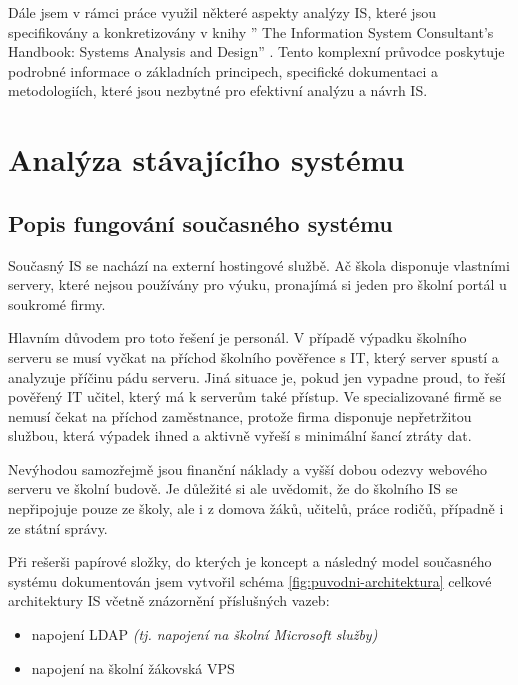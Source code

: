 \documentclass[FM,Proj]{tulthesis}
\begin{document}
Dále jsem v rámci práce využil některé aspekty analýzy
IS, které jsou specifikovány a
konkretizovány v knihy '' The Information System 
Consultant's Handbook: Systems Analysis and Design''
\cite{davis2019information}. Tento komplexní průvodce
poskytuje podrobné informace o základních principech,
specifické dokumentaci a metodologiích, 
které jsou nezbytné pro efektivní analýzu a návrh
IS.

\chapter{Analýza stávajícího systému}
\section{Popis fungování současného systému}
Současný IS se nachází na externí hostingové službě. Ač škola disponuje vlastními 
servery, které nejsou používány pro výuku, pronajímá si jeden pro školní portál u soukromé firmy.

Hlavním důvodem pro toto řešení je personál. V případě výpadku školního serveru 
se musí vyčkat na příchod školního pověřence s IT, který server spustí a analyzuje 
příčinu pádu serveru. Jiná situace je, pokud jen vypadne proud, to řeší pověřený 
IT učitel, který má k serverům také přístup. Ve specializované firmě se nemusí 
čekat na příchod zaměstnance, protože firma disponuje nepřetržitou službou, která výpadek 
ihned a aktivně vyřeší s minimální šancí ztráty dat. 

Nevýhodou samozřejmě jsou finanční náklady a vyšší dobou odezvy webového serveru 
ve školní budově. Je důležité si ale uvědomit, že do školního IS se nepřipojuje 
pouze ze školy, ale i z domova žáků, učitelů, práce rodičů, případně i ze státní správy.  

Při rešerši papírové složky, do kterých je koncept a následný model současného systému dokumentován
jsem vytvořil schéma \ref{fig:puvodni-architektura} celkové architektury IS včetně znázornění 
příslušných vazeb:
\begin{itemize}
    \item napojení LDAP \textit{(tj. napojení na školní Microsoft služby)}
    \item napojení na školní žákovská VPS
\end{itemize}
\end{document}

